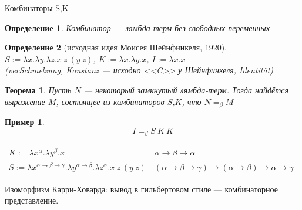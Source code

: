 \documentclass[aspectratio=169]{beamer}
\newtheorem{thm}{Теорема}[section]
\newtheorem{dfn}{Определение}[section]
\newtheorem{exm}{Пример}[section]
\begin{document}
\begin{frame}{Комбинаторы S,K}
\begin{dfn}Комбинатор --- лямбда-терм без свободных переменных
\end{dfn}
\begin{dfn}[исходная идея Моисея Шейнфинкеля, 1920]$S := \lambda x.\lambda y.\lambda z.x\ z\ (y\ z)$, $K := \lambda x.\lambda y.x$, $I := \lambda x.x$\\
(verSchmelzung, Konstanz --- исходно <<C>> у Шейнфинкеля, Identit\"at)
\end{dfn}

\begin{thm}Пусть $N$ --- некоторый замкнутый лямбда-терм. Тогда найдётся выражение $M$, состоящее из комбинаторов $S$,$K$, 
что $N =_\beta M$\end{thm}
\pause
\begin{exm}\vspace{-0.8cm}
$$I =_\beta S\ K\ K$$
\end{exm}\vspace{-0.3cm}
\begin{tabular}{ll}
$K := \lambda x^\alpha.\lambda y^\beta.x$ & $\alpha\rightarrow\beta\rightarrow\alpha$\\
$S := \lambda x^{\alpha\rightarrow\beta\rightarrow\gamma}.\lambda y^{\alpha\rightarrow\beta}.\lambda z^\alpha.x\ z\ (y\ z)$ & $(\alpha\rightarrow\beta\rightarrow\gamma)\rightarrow(\alpha\rightarrow\beta)\rightarrow\alpha\rightarrow\gamma$\\
\end{tabular}
Изоморфизм Карри-Ховарда: %
вывод в гильбертовом стиле --- комбинаторное представление.
\end{frame}
\end{document}
